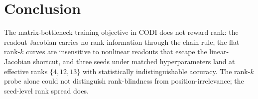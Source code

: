 \section{Conclusion}
\label{sec:conclusion}

The matrix-bottleneck training objective in CODI does not reward
rank: the readout Jacobian carries no rank information through the
chain rule, the flat rank-$k$ curves are insensitive to nonlinear
readouts that escape the linear-Jacobian shortcut, and three seeds
under matched hyperparameters land at effective ranks
$\{4, 12, 13\}$ with statistically indistinguishable accuracy. The
rank-$k$ probe alone could not distinguish rank-blindness from
position-irrelevance; the seed-level rank spread does.
